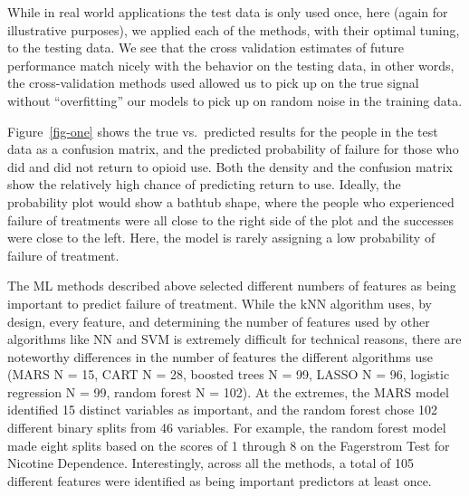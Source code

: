 \documentclass[
  number,
  preprint,
  3p,
  onecolumn]{elsarticle}
\begin{document}
While in real world applications the test data is only used once, here
(again for illustrative purposes), we applied each of the methods, with
their optimal tuning, to the testing data. We see that the cross
validation estimates of future performance match nicely with the
behavior on the testing data, in other words, the cross-validation
methods used allowed us to pick up on the true signal without
``overfitting'' our models to pick up on random noise in the training
data.

Figure~\ref{fig-one} shows the true vs.~predicted results for the people
in the test data as a confusion matrix, and the predicted probability of
failure for those who did and did not return to opioid use. Both the
density and the confusion matrix show the relatively high chance of
predicting return to use. Ideally, the probability plot would show a
bathtub shape, where the people who experienced failure of treatments
were all close to the right side of the plot and the successes were
close to the left. Here, the model is rarely assigning a low probability
of failure of treatment.

The ML methods described above selected different numbers of features as
being important to predict failure of treatment. While the kNN algorithm
uses, by design, every feature, and determining the number of features
used by other algorithms like NN and SVM is extremely difficult for
technical reasons, there are noteworthy differences in the number of
features the different algorithms use (MARS N = 15, CART N = 28, boosted
trees N = 99, LASSO N = 96, logistic regression N = 99, random forest N
= 102). At the extremes, the MARS model identified 15 distinct variables
as important, and the random forest chose 102 different binary splits
from 46 variables. For example, the random forest model made eight
splits based on the scores of 1 through 8 on the Fagerstrom Test for
Nicotine Dependence. Interestingly, across all the methods, a total of
105 different features were identified as being important predictors at
least once.
\end{document}
